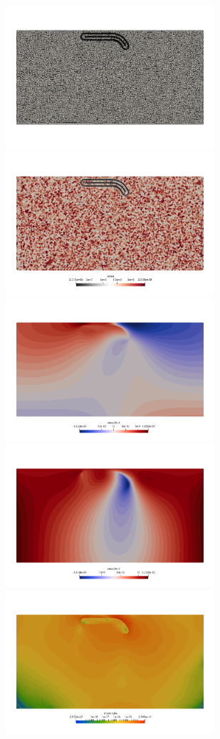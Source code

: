 \begin{center}
\includegraphics[width=7.75cm]{python_codes/fieldstone_55/images/mesh}
\includegraphics[width=7.75cm]{python_codes/fieldstone_55/images/area}\\
\includegraphics[width=7.75cm]{python_codes/fieldstone_55/images/u}
\includegraphics[width=7.75cm]{python_codes/fieldstone_55/images/v}\\
\includegraphics[width=7.75cm]{python_codes/fieldstone_55/images/sr}

\end{center}

